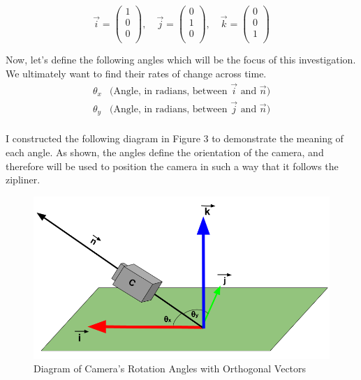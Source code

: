 \documentclass[12pt]{article}
\begin{document}
$$\vec i = \begin{pmatrix} 1 \\ 0 \\ 0 \\
\end{pmatrix}, \quad \vec j = \begin{pmatrix} 0 \\ 1 \\ 0 \\
\end{pmatrix}, \quad \vec k = \begin{pmatrix} 0 \\ 0 \\ 1 \\ \end{pmatrix}$$

Now, let's define the following angles which will be the focus of this investigation. We ultimately want to find their rates of change across time.
$$
\begin{array}{lc}
 \theta_x & \text{(Angle, in radians, between } \vec i \text{ and } \vec n \text{)}\\
 \theta_y & \text{(Angle, in radians, between } \vec j \text{ and } \vec n\text{)}\\
\end{array}
$$

I constructed the following diagram in Figure 3 to demonstrate the meaning of each angle. As shown, the angles define the orientation of the camera, and therefore will be used to position the camera in such a way that it follows the zipliner.

\begin{figure}[H]
\centering
\includegraphics[width=400pt]{img/angles.png}
\caption{\label{fig:2}Diagram of Camera's Rotation Angles with Orthogonal Vectors}
\end{figure}
\end{document}
